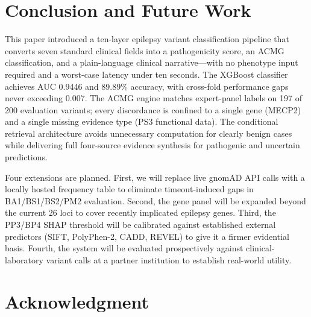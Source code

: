 \documentclass[conference]{IEEEtran}
\begin{document}
\section{Conclusion and Future Work}

This paper introduced a ten-layer epilepsy variant classification
pipeline that converts seven standard clinical fields into a
pathogenicity score, an ACMG classification, and a plain-language
clinical narrative---with no phenotype input required and a
worst-case latency under ten seconds. The XGBoost classifier
achieves AUC 0.9446 and 89.89\% accuracy, with cross-fold
performance gaps never exceeding 0.007. The ACMG engine matches
expert-panel labels on 197 of 200 evaluation variants; every
discordance is confined to a single gene (MECP2) and a single
missing evidence type (PS3 functional data). The conditional
retrieval architecture avoids unnecessary computation for clearly
benign cases while delivering full four-source evidence synthesis
for pathogenic and uncertain predictions.

Four extensions are planned. First, we will replace live gnomAD
API calls with a locally hosted frequency table to eliminate
timeout-induced gaps in BA1/BS1/BS2/PM2 evaluation. Second, the
gene panel will be expanded beyond the current 26 loci to cover
recently implicated epilepsy genes. Third, the PP3/BP4 SHAP
threshold will be calibrated against established external
predictors (SIFT, PolyPhen-2, CADD, REVEL) to give it a firmer
evidential basis. Fourth, the system will be evaluated
prospectively against clinical-laboratory variant calls at a
partner institution to establish real-world utility.

\section*{Acknowledgment}
\end{document}
